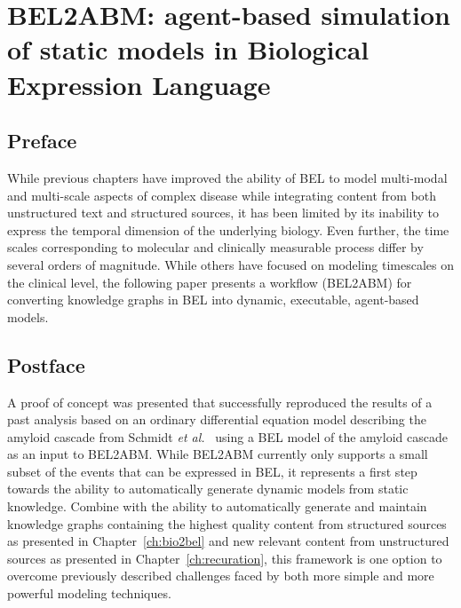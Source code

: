 \chapter{BEL2ABM: agent-based simulation of static models in Biological Expression Language}
\label{ch:bel2abm}

\section*{Preface}

While previous chapters have improved the ability of \ac{BEL} to model multi-modal and multi-scale aspects of complex disease while integrating content from both unstructured text and structured sources, it has been limited by its inability to express the temporal dimension of the underlying biology.
Even further, the time scales corresponding to molecular and clinically measurable process differ by several orders of magnitude.
While others have focused on modeling timescales on the clinical level, the following paper presents a workflow (BEL2ABM) for converting knowledge graphs in \ac{BEL} into dynamic, executable, agent-based models.

\vspace*{\fill}



\section*{Postface}

A proof of concept was presented that successfully reproduced the results of a past analysis based on an ordinary differential equation model describing the amyloid cascade from Schmidt \textit{et al.}~\cite{Schmidt2012} using a \ac{BEL} model of the amyloid cascade as an input to BEL2ABM\@.
While BEL2ABM currently only supports a small subset of the events that can be expressed in \ac{BEL}, it represents a first step towards the ability to automatically generate dynamic models from static knowledge.
Combine with the ability to automatically generate and maintain knowledge graphs containing the highest quality content from structured sources as presented in Chapter~\ref{ch:bio2bel} and new relevant content from unstructured sources as presented in Chapter~\ref{ch:recuration}, this framework is one option to overcome previously described challenges faced by both more simple and more powerful modeling techniques.
